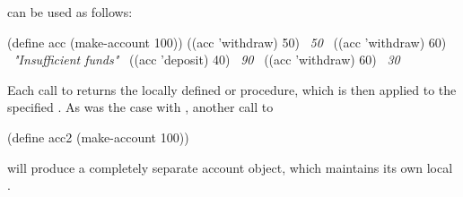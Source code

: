  can be used as follows:

\begin{codeBlock}
(define acc (make-account 100))
((acc 'withdraw) 50)
~\textit{50}~
((acc 'withdraw) 60)
~\textit{"Insufficient funds"}~
((acc 'deposit) 40)
~\textit{90}~
((acc 'withdraw) 60)
~\textit{30}~
\end{codeBlock}

\noindent
Each call to  returns the locally defined  or
 procedure, which is then applied to the specified
.  As was the case with , another call to

\begin{codeBlock}
(define acc2 (make-account 100))
\end{codeBlock}

\noindent
will produce a completely separate account object, which maintains its own
local .

